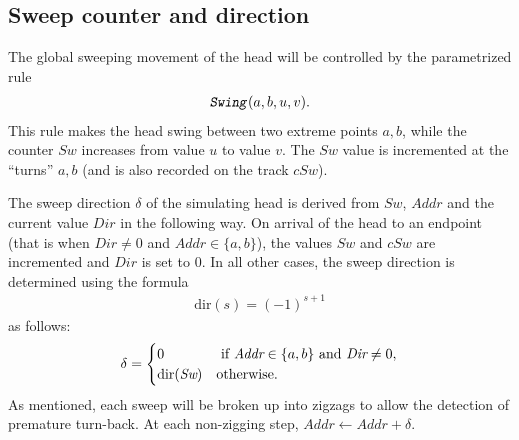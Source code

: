 \documentclass[12pt]{memoir}
\newcommand{\fld}[1]{\ensuremath{\textit{#1}}}
\newcommand{\rul}[1]{\ensuremath{\texttt{\slshape #1\/}}}
\newcommand{\Z}{Z}
\newcommand{\Addr}{\fld{Addr}}
\newcommand{\Dir}{\fld{Dir}}
\newcommand{\Sweep}{\fld{Sw}}
\newcommand{\cSweep}{\fld{cSw}}
\newcommand{\dir}{\mathrm{dir}}
\newcommand{\ruSwing}{\rul{Swing}}
\begin{document}
\subsection{Sweep counter and direction}\label{sec:sweep}

The global sweeping movement of the head will be
controlled by the parametrized rule
\begin{align*}
\ruSwing(a,b,u,v).
\end{align*}
This rule makes the head swing between two extreme points \( a,b \),
while the counter \( \Sweep \) increases from value \( u \) to value \( v \).
The \( \Sweep \) value is incremented at the ``turns'' \( a,b \) (and is
also recorded on the track \( \cSweep \)).

%
%
%


    The sweep direction \( \delta \) of the simulating head is derived from
    \( \Sweep \), \( \Addr \) and the current value \( \Dir \) in the following way.
    On arrival of the head to an endpoint (that is
    when \( \Dir \neq 0 \) and \( \Addr\in\{a,b\} \)), the values
    \( \Sweep \) and \( \cSweep \) are incremented and \( \Dir \) is set to 0.
    In all other cases, the sweep direction is determined
    using the formula
     \begin{align}\label{eq:sweep-dir}
       \dir(s)=(-1)^{s + 1}
     \end{align}
as follows: 
    \begin{equation}\label{eq:Dir}
    \delta =
      \begin{cases}
         0 & \text{ if \( \Addr\in\{a,b\} \) and \( \Dir\neq 0 \)},  \\
           \dir(\Sweep) &\text{otherwise}.
         \end{cases}
    \end{equation}
As mentioned, each sweep will be broken up into zigzags to
allow the detection of premature turn-back.
At each non-zigging step, \( \Addr \gets \Addr+\delta \).
\end{document}
